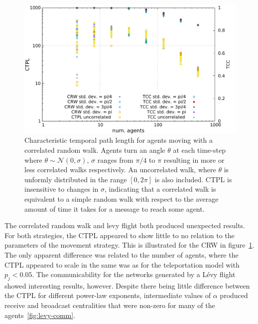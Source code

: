 \documentclass[conference]{IEEEtran}
\begin{document}
\begin{figure}
  \includegraphics[width=\columnwidth]{correlated-scaling.pdf}
  \caption{Characteristic temporal path length for agents moving with
    a correlated random walk. Agents turn an angle $\theta$ at each
    time-step where $\theta \sim \mathcal{N}(0,\sigma)$, $\sigma$
    ranges from $\pi/4$ to $\pi$ resulting in more or less correlated
    walks respectively. An uncorrelated walk, where $\theta$ is
    unformly distributed in the range $[0, 2\pi]$ is also
    included. CTPL is insensitive to changes in $\sigma$, indicating
    that a correlated walk is equivalent to a simple random walk with
    respect to the average amount of time it takes for a message to
    reach some agent.}
  \label{fig:crw-scale}
\end{figure}

The correlated random walk and levy flight both produced unexpected
results. For both strategies, the CTPL appeared to show little to no
relation to the parameters of the movement strategy. This is
illustrated for the CRW in figure~\ref{fig:crw-scale}. The only
apparent difference was related to the number of agents, where the
CTPL appeared to scale in the same was as for the teleportation model
with $p_j < 0.05$. The communicability for the networks generated by a
L\'evy flight showed interesting results, however. Despite there being
little difference between the CTPL for different power-law exponents,
intermediate values of $\alpha$ produced receive and broadcast
centralities that were non-zero for many of the
agents~\ref{fig:levy-comm}.
\end{document}
